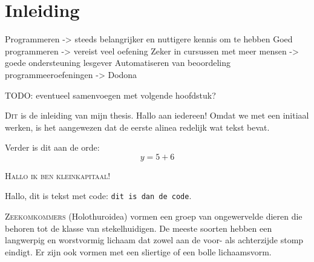 \chapter{Inleiding}\label{ch:inleiding}

Programmeren -> steeds belangrijker en nuttigere kennis om te hebben
Goed programmeren -> vereist veel oefening
Zeker in cursussen met meer mensen -> goede ondersteuning lesgever
Automatiseren van beoordeling programmeeroefeningen -> Dodona

TODO: eventueel samenvoegen met volgende hoofdstuk?

\lettrine{D}{it} is de inleiding van mijn thesis.
Hallo aan iedereen!
Omdat we met een initiaal werken, is het aangewezen dat de eerste alinea redelijk wat tekst bevat.


Verder is dit aan de orde:
\[
    y = 5 + 6
\]

\textsc{Hallo ik ben kleinkapitaal!}

Hallo, dit is tekst met code: \texttt{dit is dan de code}.

\lettrine{Z}{eekomkommers} (Holothuroidea) vormen een groep van ongewervelde dieren die behoren tot de klasse van stekelhuidigen.
De meeste soorten hebben een langwerpig en worstvormig lichaam dat zowel aan de voor- als achterzijde stomp eindigt.
Er zijn ook vormen met een sliertige of een bolle lichaamsvorm.
